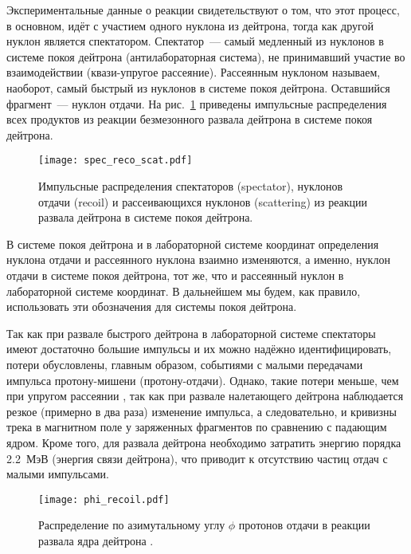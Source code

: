 Экспериментальные данные о реакции \dpfrag свидетельствуют о том, что этот
процесс, в основном, идёт с участием одного нуклона из дейтрона, тогда как
другой нуклон является спектатором. Спектатор~--- самый медленный из нуклонов в
системе покоя дейтрона (антилабораторная система), не принимавший участие во
взаимодействии (квази-упругое рассеяние). Рассеянным нуклоном называем,
наоборот, самый быстрый из нуклонов в системе покоя дейтрона. Оставшийся
фрагмент~--- нуклон отдачи. На рис.~\ref{fig:spec_reco_scat} приведены
импульсные распределения всех продуктов из реакции безмезонного развала дейтрона
\dpfrag в системе покоя дейтрона.

\begin{figure}[h]
  \centering
  \texttt{[image: spec\_reco\_scat.pdf]}
  \caption{Импульсные распределения спектаторов (spectator), нуклонов отдачи
    (recoil) и рассеивающихся нуклонов (scattering) из реакции развала дейтрона
    \dpfrag в системе покоя дейтрона.}
  \label{fig:spec_reco_scat}
\end{figure}

В системе покоя дейтрона и в лабораторной системе координат определения нуклона
отдачи и рассеянного нуклона взаимно изменяются, а именно, нуклон отдачи в
системе покоя дейтрона, тот же, что и рассеянный нуклон в лабораторной системе
координат. В дальнейшем мы будем, как правило, использовать эти обозначения для
системы покоя дейтрона.

Так как при развале быстрого дейтрона \dpfrag в лабораторной системе спектаторы
имеют достаточно большие импульсы и их можно надёжно идентифицировать, потери
обусловлены, главным образом, событиями с малыми передачами импульса
протону-мишени (протону-отдачи). Однако, такие потери меньше, чем при упругом
рассеянии \dpela, так как при развале налетающего дейтрона наблюдается резкое
(примерно в два раза) изменение импульса, а следовательно, и кривизны трека в
магнитном поле у заряженных фрагментов по сравнению с падающим ядром. Кроме
того, для развала дейтрона необходимо затратить энергию порядка 2.2~МэВ (энергия
связи дейтрона), что приводит к отсутствию частиц отдач с малыми импульсами.

\begin{figure}[h]
  \centering
  \texttt{[image: phi\_recoil.pdf]}
  \caption{Распределение по азимутальному углу $\phi$ протонов отдачи в реакции
    развала ядра дейтрона \dpfrag.}
  \label{fig:phi_recoil}
\end{figure}

